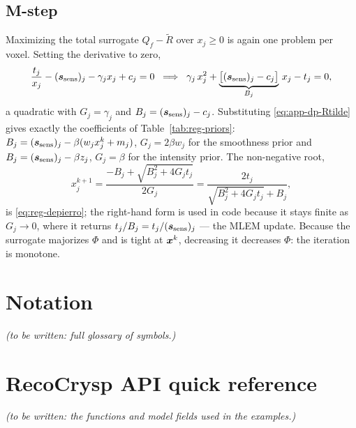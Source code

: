 \subsection*{M-step}

Maximizing the total surrogate $Q_f-\widetilde R$ over $x_j\ge0$ is again one
problem per voxel. Setting the derivative to zero,
\begin{equation}
  \frac{t_j}{x_j} - (\bm{s}_{\mathrm{sens}})_j - \gamma_j x_j + c_j = 0
  \;\;\Longrightarrow\;\;
  \gamma_j\,x_j^2 + \underbrace{\bigl[(\bm{s}_{\mathrm{sens}})_j - c_j\bigr]}_{B_j}\,x_j - t_j = 0,
\end{equation}
a quadratic with $G_j=\gamma_j$ and $B_j=(\bm{s}_{\mathrm{sens}})_j-c_j$. Substituting
\eqref{eq:app-dp-Rtilde} gives exactly the coefficients of
Table~\ref{tab:reg-priors}: $B_j=(\bm{s}_{\mathrm{sens}})_j-\beta(w_jx_j^k+m_j)$, $G_j=2\beta w_j$
for the smoothness prior and $B_j=(\bm{s}_{\mathrm{sens}})_j-\beta z_j$, $G_j=\beta$ for the
intensity prior. The non-negative root,
\begin{equation}
  x_j^{k+1} = \frac{-B_j+\sqrt{B_j^2+4G_jt_j}}{2G_j}
            = \frac{2t_j}{\sqrt{B_j^2+4G_jt_j}+B_j},
\end{equation}
is \eqref{eq:reg-depierro}; the right-hand form is used in code because it stays
finite as $G_j\to0$, where it returns $t_j/B_j=t_j/(\bm{s}_{\mathrm{sens}})_j$ --- the MLEM update.
Because the surrogate majorizes $\Phi$ and is tight at $\bm{x}^k$, decreasing it
decreases $\Phi$: the iteration is monotone.

\section{Notation}
\label{app:notation}
\textit{(to be written: full glossary of symbols.)}

\section{RecoCrysp API quick reference}
\label{app:api}
\textit{(to be written: the functions and model fields used in the examples.)}
